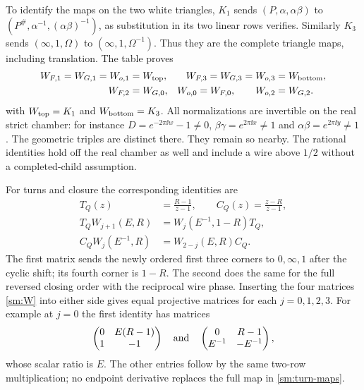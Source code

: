 To identify the maps on the two white triangles, $K_1$ sends
$(P,\alpha,\alpha\beta)$ to
$(P^\#,\alpha^{-1},(\alpha\beta)^{-1})$, as substitution
in its two linear rows verifies. Similarly $K_3$ sends
$(\infty,1,\Omega)$ to $(\infty,1,\Omega^{-1})$.
Thus they are the complete triangle maps, including translation.
The table proves
\begin{equation}\label{sm:prism-maps}
\begin{aligned}
 W_{F,1}=W_{G,1}=W_{o,1}&=W_{\rm top},&
 W_{F,3}=W_{G,3}=W_{o,3}&=W_{\rm bottom},\\
 W_{F,2}&=W_{G,0},&
 W_{o,0}=W_{F,0},\qquad W_{o,2}&=W_{G,2}.
\end{aligned}
\end{equation}
with $W_{\rm top}=K_1$ and $W_{\rm bottom}=K_3$.
All normalizations are invertible on the real strict chamber:
for instance $D=e^{-2\pi\ii w}-1\ne0$,
$\beta\gamma=e^{2\pi\ii x}\ne1$ and
$\alpha\beta=e^{2\pi\ii y}\ne1$.
The geometric triples are distinct there. They remain so nearby.
The rational identities hold off the real chamber as well and
include a wire above $1/2$ without a completed-child assumption.

For turns and closure the corresponding identities are
\begin{equation}\label{sm:turn-maps}
\begin{split}
 T_Q(z)&=\frac{R-1}{z-1},\qquad C_Q(z)=\frac{z-R}{z-1},\\
 T_QW_{j+1}(E,R)&=W_j(E^{-1},1-R)T_Q,\\
 C_QW_j(E^{-1},R)&=W_{2-j}(E,R)C_Q .
\end{split}
\end{equation}
The first matrix sends the newly ordered first three corners
to $0,\infty,1$ after the cyclic shift; its fourth corner is
$1-R$. The second does the same for the full reversed closing
order with the reciprocal wire phase. Inserting the four
matrices \eqref{sm:W} into either side gives equal projective
matrices for each $j=0,1,2,3$. For example at $j=0$ the first
identity has matrices
\[
 \begin{pmatrix}0&E(R-1)\\1&-1\end{pmatrix}
 \quad\hbox{and}\quad
 \begin{pmatrix}0&R-1\\E^{-1}&-E^{-1}\end{pmatrix},
\]
whose scalar ratio is $E$. The other entries follow by the
same two-row multiplication; no endpoint derivative replaces
the full map in \eqref{sm:turn-maps}.

